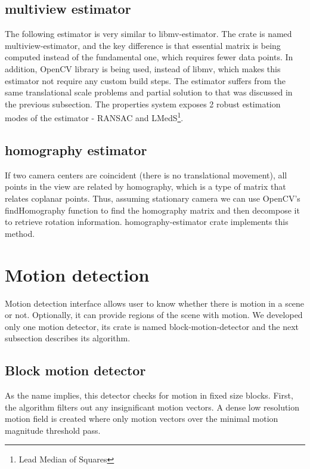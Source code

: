 \documentclass[11pt,english]{report}
\begin{document}
\subsection{multiview estimator}

The following estimator is very similar to libmv-estimator. The crate is named multiview-estimator, and the key difference is that essential matrix is being computed instead of the fundamental one, which requires fewer data points. In addition, OpenCV library is being used, instead of libmv, which makes this estimator not require any custom build steps. The estimator suffers from the same translational scale problems and partial solution to that was discussed in the previous subsection. The properties system exposes 2 robust estimation modes of the estimator - RANSAC and LMedS\footnote{Lead Median of Squares}.

\subsection{homography estimator}

If two camera centers are coincident (there is no translational movement), all points in the view are related by homography\cite{hartley_zisserman_2004}, which is a type of matrix that relates coplanar points. Thus, assuming stationary camera we can use OpenCV's findHomography function to find the homography matrix and then decompose it to retrieve rotation information. homography-estimator crate implements this method.

\section{Motion detection}

Motion detection interface allows user to know whether there is motion in a scene or not. Optionally, it can provide regions of the scene with motion. We developed only one motion detector, its crate is named block-motion-detector and the next subsection describes its algorithm.

\subsection{Block motion detector}

As the name implies, this detector checks for motion in fixed size blocks. First, the algorithm filters out any insignificant motion vectors. A dense low resolution motion field is created where only motion vectors over the minimal motion magnitude threshold pass.
\end{document}
